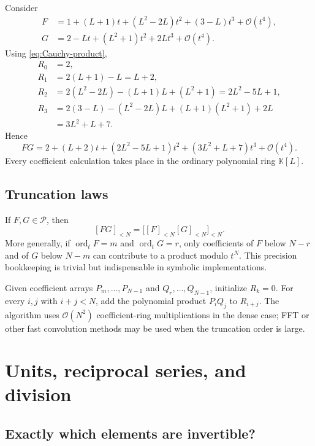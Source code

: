 \documentclass[11pt]{article}
\theoremstyle{pltheorem}
\newcommand{\K}{\mathbb K}
\newcommand{\PL}{\mathscr P}
\newcommand{\bigO}{\mathcal O}
\newcommand{\ordt}{\operatorname{ord}_t}
\begin{document}
Consider
\begin{align*}
 F&=1+(L+1)t+(L^2-2L)t^2+(3-L)t^3+\bigO(t^4),\\
 G&=2-Lt+(L^2+1)t^2+2Lt^3+\bigO(t^4).
\end{align*}
Using \cref{eq:Cauchy-product},
\begin{align*}
 R_0&=2,\\
 R_1&=2(L+1)-L=L+2,\\
 R_2&=2(L^2-2L)-(L+1)L+(L^2+1)
      =2L^2-5L+1,\\
 R_3&=2(3-L)-(L^2-2L)L+(L+1)(L^2+1)+2L\\
    &=3L^2+L+7.
\end{align*}
Hence
\begin{equation}\label{eq:worked-product}
 FG=2+(L+2)t+(2L^2-5L+1)t^2+(3L^2+L+7)t^3+\bigO(t^4).
\end{equation}
Every coefficient calculation takes place in the ordinary polynomial ring \(\K[L]\).

\subsection{Truncation laws}

If \(F,G\in\PL\), then
\begin{equation}\label{eq:truncated-product-law}
 [FG]_{<N}=\bigl[[F]_{<N}[G]_{<N}\bigr]_{<N}.
\end{equation}
More generally, if \(\ordt F=m\) and \(\ordt G=r\), only coefficients of \(F\) below \(N-r\) and of \(G\) below \(N-m\) can contribute to a product modulo \(t^N\).  This precision bookkeeping is trivial but indispensable in symbolic implementations.

\begin{algorithmbox}
Given coefficient arrays \(P_m,\ldots,P_{N-1}\) and
\(Q_r,\ldots,Q_{N-1}\), initialize \(R_k=0\).  For every
\(i,j\) with \(i+j<N\), add the polynomial product \(P_iQ_j\) to
\(R_{i+j}\).  The algorithm uses \(\bigO(N^2)\) coefficient-ring
multiplications in the dense case; FFT or other fast convolution methods may be used when the truncation order is large.
\end{algorithmbox}

\section{Units, reciprocal series, and division}
\label{sec:division}

\subsection{Exactly which elements are invertible?}
\end{document}

